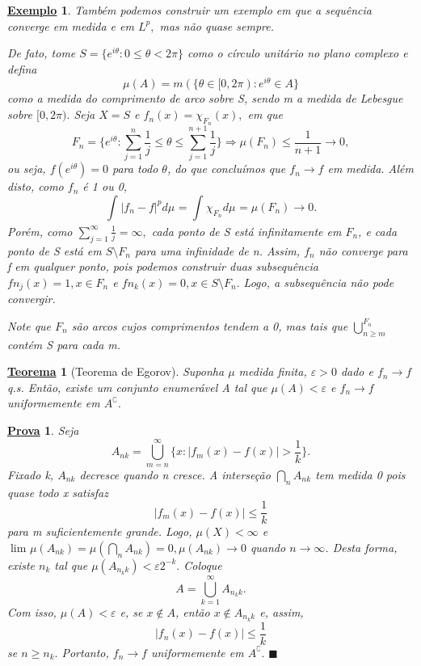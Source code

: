 \documentclass{article}
\newtheorem*{theorem*}{\underline{Teorema}}
\newtheorem{example}{\underline{Exemplo}}
\newtheorem*{proof*}{\underline{Prova}}
\renewcommand\qedsymbol{$\blacksquare$}
\begin{document}
\begin{example}
  Também podemos construir um exemplo em que a sequência converge em medida e em \(L^{p},\) mas não quase sempre. 

  De fato, tome \(S = \{e^{i\theta }: 0 \leq \theta < 2\pi \}\) como o círculo unitário no plano complexo e defina 
    \[
      \mu (A) = m(\{\theta \in [0, 2\pi ): e^{i\theta }\in A\}
    \]
  como a medida do comprimento de arco sobre S, sendo m a medida de Lebesgue sobre \([0, 2\pi ).\) Seja \(X = S\) e \(f_{n}(x) = \chi_{F_{n}}(x),\) em que 
    \[
      F_{n} = \biggl\{e^{i\theta }: \sum\limits_{j=1}^{n}\frac{1}{j} \leq \theta \leq \sum\limits_{j=1}^{n+1}\frac{1}{j}\biggr\} \Rightarrow \mu (F_{n}) \leq \frac{1}{n+1}\to 0,
    \]
  ou seja, \(f(e^{i\theta }) = 0\) para todo \(\theta \), do que concluímos que \(f_{n}\to f\) em medida. Além disto, como \(f_{n}\) é 1 ou 0, 
    \[
      \int_{}|f_{n}-f|^{p} d\mu_{} = \int_{}\chi_{F_{n}} d\mu_{} = \mu (F_{n})\to 0.
    \]
  Porém, como \(\sum\limits_{j=1}^{\infty}\frac{1}{j} = \infty,\) cada ponto de S está infinitamente em \(F_{n}\), e cada ponto de S está em \(S\setminus{F_{n}}\) para uma infinidade de n. Assim, 
  \(f_{n}\) não converge para f em qualquer ponto, pois podemos construir duas subsequência \(fn_{j}(x) = 1, x\in F_{n}\) e \(fn_{k}(x) = 0, x\in S\setminus{F_{n}}.\) Logo, a subsequência não pode convergir. 

  Note que \(F_{n}\) são arcos cujos comprimentos tendem a 0, mas tais que \(\bigcup_{n\geq m}^{F_{n}}\) contém S para cada m.
\end{example}
 \hypertarget{egorov}{
   \begin{theorem*}[Teorema de Egorov]
  Suponha \(\mu \) medida finita, \(\varepsilon > 0\) dado e \(f_{n}\to f\) q.s. Então, existe um conjunto enumerável A tal que \(\mu (A) < \varepsilon \) e \(f_{n}\to f\) uniformemente em \(A ^{\complement}\).
\end{theorem*}}
\begin{proof*}
  Seja 
    \[
      A_{nk} = \bigcup_{m=n}^{\infty}\biggl\{x: |f_{m}(x) - f(x)| > \frac{1}{k}\biggr\}.
    \]
  Fixado k, \(A_{nk}\) decresce quando n cresce. A interseção \(\bigcap_{n}^{}A_{nk}\) tem medida 0 pois quase todo x satisfaz 
    \[
      |f_{m}(x) - f(x)| \leq \frac{1}{k}
    \]
  para m suficientemente grande. Logo, \(\mu (X) < \infty\) e \(\lim_{} \mu (A_{nk}) = \mu (\bigcap_{n}^{}A_{nk}) = 0, \mu (A_{nk})\to 0\) quando \(n\to \infty\). Desta forma, existe \(n_{k}\) tal que 
 \(\mu (A_{n_kk}) < \varepsilon 2^{-k}. \) Coloque 
   \[
     A = \bigcup_{k=1}^{\infty}A_{n_kk}.
   \]
  Com isso, \(\mu (A) < \varepsilon \) e, se \(x\not\in A\), então \(x\not\in A_{n_{k}k}\) e, assim, 
    \[
      |f_{n}(x) - f(x)| \leq \frac{1}{k}
    \]
  se \(n \geq n_{k}.\) Portanto, \(f_{n}\to f\) uniformemente em \(A ^{\complement}.\) \qedsymbol
\end{proof*}
\end{document}
